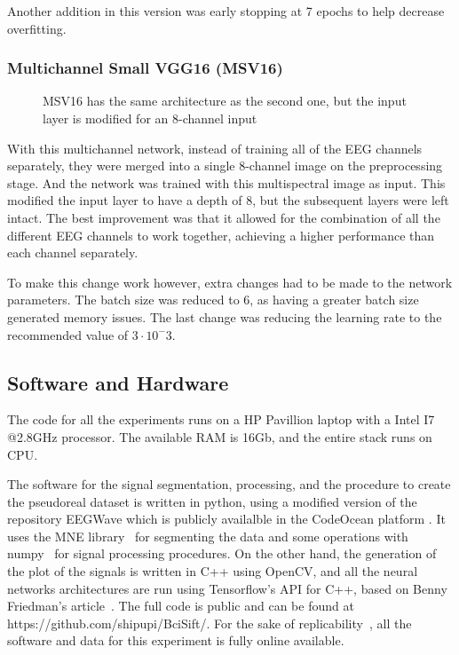 \documentclass[conference]{IEEEtran}
\begin{document}
Another addition in this version was early stopping at 7 epochs to help decrease overfitting. 

\subsubsection{Multichannel Small VGG16 (MSV16)}

\begin{figure}[h]

\caption[MSV16 Neural Network]{MSV16 has the same architecture as the second one, but the input layer is modified for an 8-channel input}
\label{fig:nnv3}
\end{figure}

With this multichannel network, instead of training all of the EEG channels separately, they were merged into a single 8-channel image on the preprocessing stage. And the network was trained with this multispectral image as input. This modified the input layer to have a depth of 8, but the subsequent layers were left intact. The best improvement was that it allowed for the combination of all the different EEG channels to work together, achieving a higher performance than each channel separately.

To make this change work however, extra changes had to be made to the network parameters. The batch size was reduced to 6, as having a greater batch size generated memory issues. The last change was reducing the learning rate to the recommended value of $3\cdot10^-3$.

\subsection{Software and Hardware}
The code for all the experiments runs on a HP Pavillion laptop with a Intel I7 @2.8GHz processor. The available RAM is 16Gb, and the entire stack runs on CPU.

The software for the signal segmentation, processing, and the procedure to create the pseudoreal dataset is written in python, using a modified version of the repository EEGWave which is publicly availalble in the CodeOcean platform \cite{Ramele2018EEGWA}. It uses the MNE library~\cite{Gramfort.etal2014} for segmenting the data and some operations with numpy~\cite{Harris.etal2020} for signal processing procedures.
On the other hand, the generation of the plot of the signals is written in C++ using OpenCV, and all the neural networks architectures  are run using Tensorflow's API for C++, based on Benny Friedman's article~\cite{BennyCNN}. The full code is public and can be found at https://github.com/shipupi/BciSift/.  For the sake of replicability~\cite{Pavlov.etal2021}, all the software and data for this experiment is fully online available.
\end{document}
